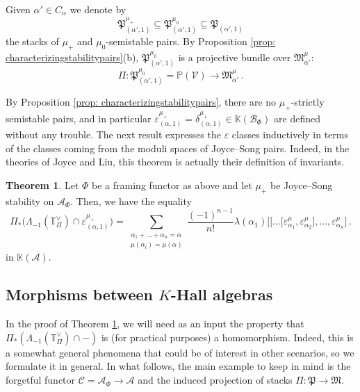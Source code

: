 \documentclass[12pt]{amsart}
\theoremstyle{definition}
\newtheorem{theorem}[definition]{Theorem}
\newcommand{\BK}{{\mathbb{K}}}
\newcommand{\BP}{{\mathbb{P}}}
\newcommand{\BT}{{\mathbb{T}}}
\newcommand{\CA}{{\mathcal A}}
\newcommand{\CB}{{\mathcal B}}
\newcommand{\CC}{{\mathcal C}}
\newcommand{\CV}{{\mathcal V}}
\newcommand{\1}{\mathbf 1}
\newcommand{\FP}{{\mathfrak{P}}}
\newcommand{\FM}{{\mathfrak{M}}}
\begin{document}
Given $\alpha'\in C_\alpha$ we denote by
\[\FP_{(\alpha',1)}^{\mu_+}\subseteq \FP_{(\alpha',1)}^{\mu_0}\subseteq \FP_{(\alpha',1)}\]
the stacks of $\mu_+$ and $\mu_0$-semistable pairs. By Proposition \ref{prop: characterizingstabilitypairs}(b), $\FP_{(\alpha', 1)}^{\mu_0}$ is a projective bundle over $\FM_{\alpha'}^\mu$:
\[\Pi\colon \FP_{(\alpha', 1)}^{\mu_0}=\BP(\CV)\to \FM_{\alpha'}^\mu\,.\]

By Proposition \ref{prop: characterizingstabilitypairs}, there are no $\mu_+$-strictly semistable pairs, and in particular $\varepsilon_{(\alpha, 1)}^{\mu_+}=\delta_{(\alpha, 1)}^{\mu_+}\in \BK(\CB_{\Phi})$ are defined without any trouble. The next result expresses the $\varepsilon$ classes inductively in terms of the classes coming from the moduli spaces of Joyce--Song pairs. Indeed, in the theories of Joyce and Liu, this theorem is actually their definition of invariants. 

\begin{theorem}\label{thm: comparisonJL}
Let $\Phi$ be a framing functor as above and let $\mu_+$ be Joyce--Song stability on $\CA_\Phi$. Then, we have the equality
    \begin{equation}\label{eq: framingdefinitionepsilon}
        \Pi_\ast\big(\Lambda_{-1}(\BT_\Pi^\vee)\cap \varepsilon_{(\alpha, 1)}^{\mu_+}\big)=\sum_{\substack{\alpha_{1}+\ldots+\alpha_n=\alpha\\
        \mu(\alpha_i)=\mu(\alpha)}}\frac{(-1)^{n-1}}{n!}\lambda(\alpha_1)\big[\big[\ldots\big[\varepsilon_{\alpha_1}^\mu,\varepsilon_{\alpha_2}^\mu\big],\ldots, \varepsilon_{\alpha_n}^\mu\big]\,. 
    \end{equation}
    in $\BK(\CA)$.
\end{theorem}


\subsection{Morphisms between $K$-Hall algebras}
\label{subsec: morphismsKHall}

In the proof of Theorem \ref{thm: comparisonJL}, we will need as an input the property that $\Pi_\ast(\Lambda_{-1}(\BT_\Pi^\vee)\cap -)$ is (for practical purposes) a homomorphism. Indeed, this is a somewhat general phenomena that could be of interest in other scenarios, so we formulate it in general. In what follows, the main example to keep in mind is the forgetful functor $\CC=\CA_\Phi\to \CA$ and the induced projection of stacks $\Pi\colon \FP\to \FM$.
\end{document}
